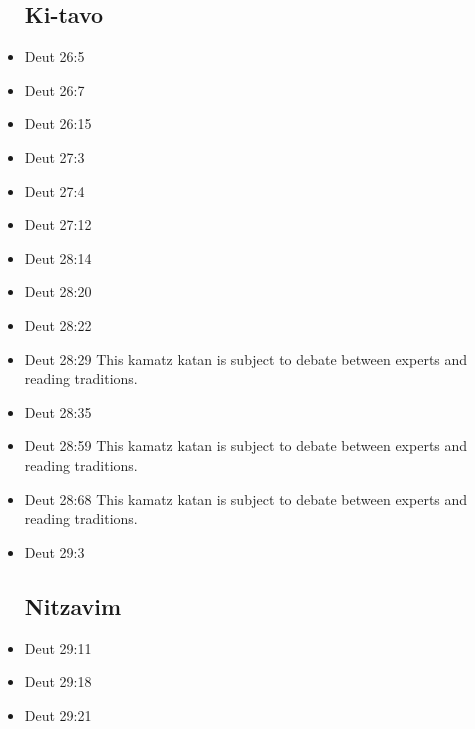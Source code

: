 \documentclass[14pt]{book}
\begin{document}
\begin{multicols}{2}
\begin{itemize}
\subsection{Ki-tavo}

\item Deut 26:5

\item Deut 26:7

\item Deut 26:15

\item Deut 27:3

\item Deut 27:4

\item Deut 27:12

\item Deut 28:14

\item Deut 28:20

\item Deut 28:22

\item Deut 28:29 This kamatz katan is subject to debate between experts and reading traditions.

\item Deut 28:35

\item Deut 28:59 This kamatz katan is subject to debate between experts and reading traditions.

\item Deut 28:68 This kamatz katan is subject to debate between experts and reading traditions.

\item Deut 29:3

\subsection{Nitzavim}

\item Deut 29:11

\item Deut 29:18

\item Deut 29:21


\end{itemize}
\end{multicols}
\end{document}
